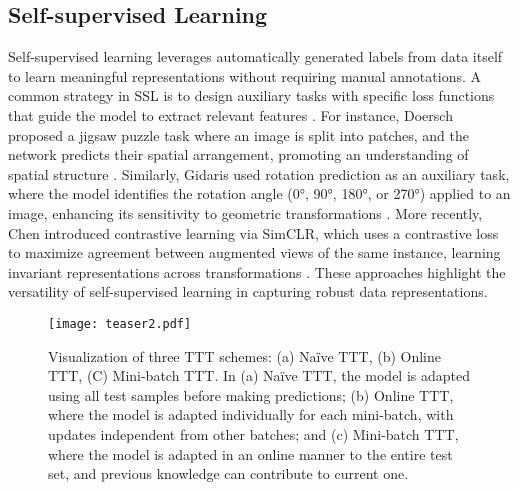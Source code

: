 \subsection{Self-supervised Learning}
Self-supervised learning leverages automatically generated labels from data itself to learn meaningful representations without requiring manual annotations. A common strategy in SSL is to design auxiliary tasks with specific loss functions that guide the model to extract relevant features \cite{noroozi2016unsupervised, chen2019self, taleb2021multimodal}. For instance, Doersch proposed a jigsaw puzzle task where an image is split into patches, and the network predicts their spatial arrangement, promoting an understanding of spatial structure \cite{doersch2015unsupervised}. Similarly, Gidaris used rotation prediction as an auxiliary task, where the model identifies the rotation angle (0°, 90°, 180°, or 270°) applied to an image, enhancing its sensitivity to geometric transformations \cite{gidaris2018unsupervised}. More recently, Chen introduced contrastive learning via SimCLR, which uses a contrastive loss to maximize agreement between augmented views of the same instance, learning invariant representations across transformations \cite{chen2020simple}. These approaches highlight the versatility of self-supervised learning in capturing robust data representations. 

\begin{figure*}
    \centering
    \texttt{[image: teaser2.pdf]}
    \caption{Visualization of three TTT schemes: (a) Naïve TTT, (b) Online TTT, (C) Mini-batch TTT. In (a) Naïve TTT, the model is adapted using all test samples before making predictions; (b) Online TTT, where the model is adapted individually for each mini-batch, with updates independent from other batches; and (c) Mini-batch TTT, where the model is adapted in an online manner to the entire test set, and previous knowledge can contribute to current one. }
    \label{fig:teaser2}
\end{figure*}